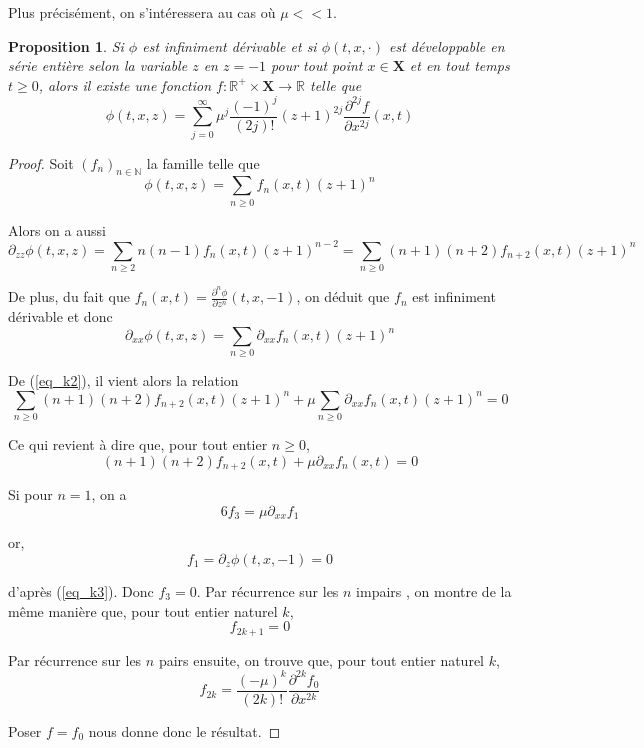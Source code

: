 \documentclass[12pt,a4paper]{article}
\newtheorem{prop}[dfn]{\textbf{Proposition}}
\numberwithin{equation}{section}
\begin{document}
Plus précisément, on s'intéressera au cas où $\mu << 1$.
\begin{prop}
    Si $\phi$ est infiniment dérivable et si $\phi(t,x,\cdot)$ est développable en série entière selon la variable $z$ en $z = -1$ pour tout point $x \in \textbf{X}$ et en tout temps $t\geq 0$, alors il existe une fonction $f:\mathbb{R}^+\times\textbf{X}\rightarrow \mathbb{R}$ telle que
    \begin{equation}
        \phi (t,x,z) = \sum_{j = 0}^\infty \mu^j\frac{(-1)^j}{(2j)!} (z+1)^{2j}\frac{\partial^{2j}f}{\partial x^{2j}}(x,t)
    \end{equation}
\end{prop}
\begin{proof}
Soit $(f_n)_{n\in \mathbb{N}}$ la famille telle que
\begin{equation*}
    \phi (t,x,z) = \sum_{n\geq 0} f_n(x,t)(z+1)^n
\end{equation*}

Alors on a aussi
\begin{equation*}
    \partial_{zz}\phi(t,x,z) = \sum_{n\geq 2} n(n-1)f_n(x,t)(z+1)^{n-2} =  \sum_{n\geq 0} (n+1)(n+2)f_{n+2}(x,t)(z+1)^{n}
\end{equation*}

De plus, du fait que $f_n(x,t) = \frac{\partial^n\phi}{\partial z ^n}(t,x,-1)$, on déduit que $f_n$ est infiniment dérivable et donc 
\begin{equation*}
    \partial_{xx}\phi(t,x,z) = \sum_{n\geq 0}  \partial_{xx}f_n(x,t)(z+1)^{n}
\end{equation*}

De (\ref{eq_k2}), il vient alors la relation
\begin{equation*}
    \sum_{n\geq 0} (n+1)(n+2)f_{n+2}(x,t)(z+1)^{n} + \mu\sum_{n\geq 0}  \partial_{xx}f_n(x,t)(z+1)^{n} = 0
\end{equation*}

Ce qui revient à dire que, pour tout entier $n\geq 0$, 
\begin{equation*}
    (n+1)(n+2)f_{n+2}(x,t) + \mu\partial_{xx}f_n(x,t) = 0
\end{equation*}

Si pour $n = 1$, on a $$6f_3 = \mu\partial_{xx}f_1$$ 

or, $$f_1 = \partial_{z}\phi(t,x,-1) = 0$$ 

d'après (\ref{eq_k3}). Donc $f_3 = 0 $. Par récurrence sur les $n$ impairs , on montre de la même manière que, pour tout entier naturel $k$,
$$f_{2k+1} = 0$$

Par récurrence sur les $n$ pairs ensuite, on trouve que, pour tout entier naturel $k$,
$$f_{2k} = \frac{(-\mu)^k}{(2k)!}\frac{\partial^{2k} f_0}{\partial x ^{2k}}$$

Poser $f = f_0$ nous donne donc le résultat.
\end{proof}
\end{document}
